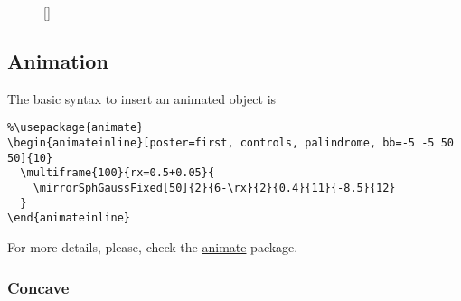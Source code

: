 \documentclass[a4paper,10pt]{article}
\begin{document}
\begin{figure}[!ht]
  \centering
  \begin{minipage}[c]{0.45\linewidth}
  \end{minipage} %
  \begin{minipage}[c]{0.45\linewidth}
  \end{minipage}
  [\linewidth]{
    \hfill
  }
\end{figure}



\subsection{Animation}

The basic syntax to insert an animated object is
\begin{FHZmirroLensTcolorbox}
\begin{verbatim}
%\usepackage{animate}
\begin{animateinline}[poster=first, controls, palindrome, bb=-5 -5 50 50]{10}
  \multiframe{100}{rx=0.5+0.05}{
    \mirrorSphGaussFixed[50]{2}{6-\rx}{2}{0.4}{11}{-8.5}{12}
  }
\end{animateinline}
\end{verbatim}
\end{FHZmirroLensTcolorbox}

For more details, please, check the \href{https://ctan.org/pkg/animate}{animate} package.

\subsubsection{Concave}
\end{document}
